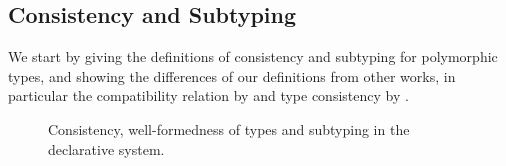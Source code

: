 
\subsection{Consistency and Subtyping}
\label{subsec:consistency-subtyping}

We start by giving the definitions of consistency and subtyping for polymorphic
types, and showing the differences of our definitions from other works, in
particular the compatibility relation by \citet{ahmed2011blame} and type
consistency by \citet{yuu2017poly}.

\begin{figure}[t]
  \begin{small}


  \end{small}
  \caption{Consistency, well-formedness of types and subtyping in the declarative system.}
  \label{fig:decl:subtyping}
\end{figure}

